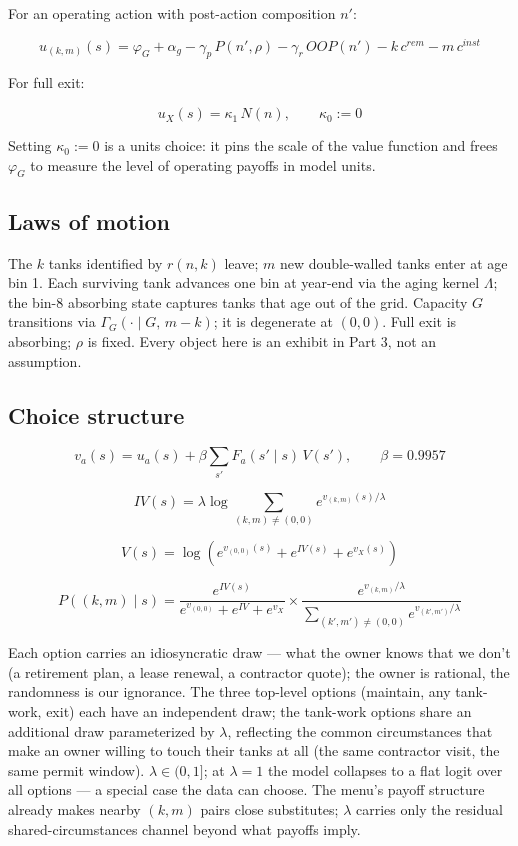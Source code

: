 \documentclass[
  letterpaper,
  DIV=11,
  numbers=noendperiod]{scrartcl}
\begin{document}
For an operating action with post-action composition \(n'\):

\[
u_{(k,m)}(s) = \varphi_G + \alpha_g - \gamma_p\, P(n',\rho)
- \gamma_r\, OOP(n') - k\, c^{rem} - m\, c^{inst}
\]

For full exit:

\[
u_X(s) = \kappa_1\, N(n), \qquad \kappa_0 := 0
\]

Setting \(\kappa_0 := 0\) is a units choice: it pins the scale of the
value function and frees \(\varphi_G\) to measure the level of operating
payoffs in model units.

\subsection{Laws of motion}\label{laws-of-motion}

The \(k\) tanks identified by \(r(n,k)\) leave; \(m\) new double-walled
tanks enter at age bin 1. Each surviving tank advances one bin at
year-end via the aging kernel \(\Lambda\); the bin-8 absorbing state
captures tanks that age out of the grid. Capacity \(G\) transitions via
\(\Gamma_G(\cdot \mid G,\, m-k)\); it is degenerate at \((0,0)\). Full
exit is absorbing; \(\rho\) is fixed. Every object here is an exhibit in
Part 3, not an assumption.

\subsection{Choice structure}\label{choice-structure}

\[
v_a(s) = u_a(s) + \beta \sum_{s'} F_a(s' \mid s)\, V(s'), \qquad \beta = 0.9957
\]

\[
IV(s) = \lambda \log \sum_{(k,m) \ne (0,0)} e^{v_{(k,m)}(s)/\lambda}
\]

\[
V(s) = \log\!\left( e^{v_{(0,0)}(s)} + e^{IV(s)} + e^{v_X(s)} \right)
\]

\[
P\!\left((k,m) \mid s\right) = \frac{e^{IV(s)}}{e^{v_{(0,0)}} + e^{IV} +
e^{v_X}} \times \frac{e^{v_{(k,m)}/\lambda}}{\sum_{(k',m') \ne (0,0)}
e^{v_{(k',m')}/\lambda}}
\]

Each option carries an idiosyncratic draw --- what the owner knows that
we don't (a retirement plan, a lease renewal, a contractor quote); the
owner is rational, the randomness is our ignorance. The three top-level
options (maintain, any tank-work, exit) each have an independent draw;
the tank-work options share an additional draw parameterized by
\(\lambda\), reflecting the common circumstances that make an owner
willing to touch their tanks at all (the same contractor visit, the same
permit window). \(\lambda \in (0,1]\); at \(\lambda = 1\) the model
collapses to a flat logit over all options --- a special case the data
can choose. The menu's payoff structure already makes nearby \((k,m)\)
pairs close substitutes; \(\lambda\) carries only the residual
shared-circumstances channel beyond what payoffs imply.
\end{document}
